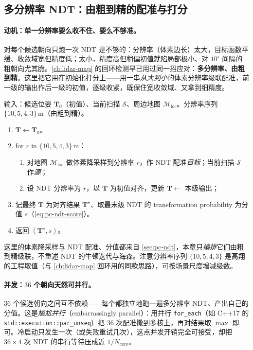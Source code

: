 \subsection{多分辨率 NDT：由粗到精的配准与打分}
\label{sec:lidar-loc-multi}

\paragraph{动机：单一分辨率要么收不住、要么不够准。}
对每个候选朝向只跑一次 NDT 是不够的：分辨率（体素边长）太大，目标函数平缓、收敛域宽但精度低；太小，精度高但稍偏初值就陷局部极小、对 $10^\circ$ 间隔的粗朝向尤其脆。\cref{ch:lidar-map} 的回环检测早已用过同一招应对：\textbf{多分辨率、由粗到精}。这里把它用在初始化打分上——用一串\emph{从大到小}的体素分辨率级联配准，前一级的输出作后一级的初值，逐级收紧，既保住宽收敛域、又拿到细精度。

\begin{algo}\label{alg:lidar-loc-multi}
输入：候选位姿 $\mathbf T_0$（初值）、当前扫描 $\mathcal S$、周边地图 $\mathcal M_{\mathrm{loc}}$。分辨率序列 $\{10,5,4,3\}$\,m（由粗到精）。
\begin{enumerate}
  \item $\mathbf T\!\leftarrow\!\mathbf T_0$。
  \item for $r$ in $\{10,5,4,3\}$\,m：
  \begin{enumerate}
    \item 对地图 $\mathcal M_{\mathrm{loc}}$ 做体素降采样到分辨率 $r$，作 NDT 配准\emph{目标}；当前扫描 $\mathcal S$ 作\emph{源}；
    \item 设 NDT 分辨率为 $r$，以 $\mathbf T$ 为初值对齐，更新 $\mathbf T\!\leftarrow$ 本级输出；
  \end{enumerate}
  \item 记最终 $\mathbf T$ 为对齐结果 $\mathbf T^\star$、取最末级 NDT 的 transformation probability 为分值 $s$（\cref{eq:pc-ndt-score}）。
  \item 返回 $(\mathbf T^\star, s)$。
\end{enumerate}
\end{algo}

\noindent{}这里的体素降采样与 NDT 配准、分值都来自 \cref{sec:pc-ndt}，本章只\emph{编排}它们由粗到精级联，不重述 NDT 的牛顿迭代与海森。注意分辨率序列 $\{10,5,4,3\}$ 是高翔的工程取值（与 \cref{ch:lidar-map} 回环用的同款思路），可按场景尺度增减级数。

\paragraph{并发：$36$ 个朝向天然可并行。}
$36$ 个候选朝向之间互不依赖——每个都独立地跑一遍多分辨率 NDT、产出自己的分值。这是\emph{尴尬并行}（embarrassingly parallel）：用并行 \texttt{for\_each}（如 C++17 的 \texttt{std::execution::par\_unseq}）把 $36$ 次配准撒到多核上，再对结果取 $\max$ 即可。冷启动只发生一次（或失败重试几次），这点并发开销完全可接受，却把 $36\times4$ 次 NDT 的串行等待压成近 $1/N_{\mathrm{core}}$。

